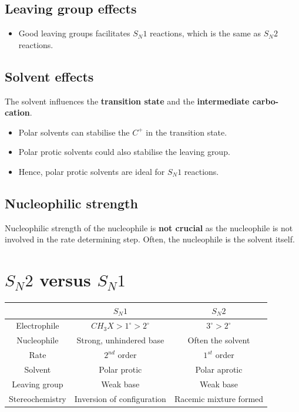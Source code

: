 \documentclass[11pt]{article}
\begin{document}
\subsection{Leaving group effects}
\label{sec:org6071103}
\begin{itemize}
\item Good leaving groups facilitates \(S_N 1\) reactions, which is the same as \(S_N 2\) reactions.
\end{itemize}
\subsection{Solvent effects}
\label{sec:org318bfcd}
The solvent influences the \textbf{transition state} and the \textbf{intermediate carbo-cation}.

\begin{itemize}
\item Polar solvents can stabilise the \(C^+\) in the transition state.
\item Polar protic solvents could also stabilise the leaving group.
\item Hence, polar protic solvents are ideal for \(S_N 1\) reactions.
\end{itemize}
\subsection{Nucleophilic strength}
\label{sec:org8ce4fe9}
Nucleophilic strength of the nucleophile is \textbf{not crucial} as the nucleophile is not involved in the rate determining step. Often, the nucleophile is the solvent itself.
\section{\(S_N 2\) versus \(S_N 1\)}
\label{sec:orged1d4f9}
\begin{tabular}{c|c|c}
& \(S_N 1\) & \(S_N 2\) \\
\hline
Electrophile & \(CH_3 X > 1^{\circ} > 2^{\circ}\) & \(3^{\circ} > 2^{\circ}\) \\
Nucleophile & Strong, unhindered base & Often the solvent \\
Rate & \(2^{nd}\) order & \(1^{st}\) order \\
Solvent & Polar protic & Polar aprotic \\
Leaving group & Weak base & Weak base \\
Stereochemistry & Inversion of configuration & Racemic mixture formed \\
\end{tabular}
\end{document}
